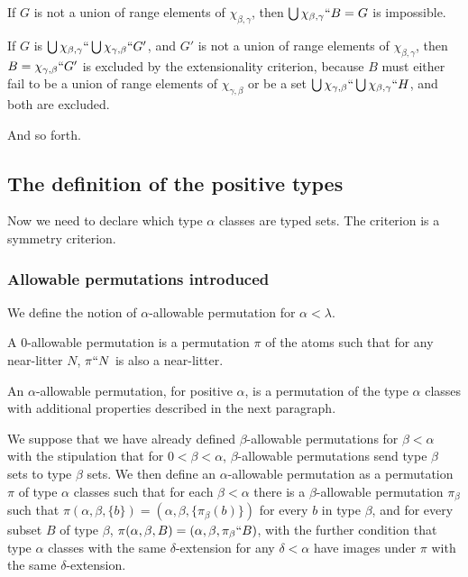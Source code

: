 \documentclass[12pt]{article}
\begin{document}
If $G$ is not a union of range elements of $\chi_{\beta,\gamma}$, then $\bigcup \chi_{\beta,\gamma}``B=G$ is impossible.

If $G$ is $\bigcup \chi_{\beta,\gamma}``\bigcup \chi_{\gamma,\beta}``G'$, and $G'$ is not a union of range elements of $\chi_{\beta,\gamma}$,
then $B=\chi_{\gamma,\beta}``G'$ is excluded by the extensionality criterion, because $B$ must either fail to be a union of range elements of $\chi_{\gamma,\beta}$ or
be a set $\bigcup \chi_{\gamma,\beta}``\bigcup \chi_{\beta,\gamma}``H$, and both are excluded.

And so forth.

\subsection{The definition of the positive types}

Now we need to declare which type $\alpha$ classes are typed sets.  The criterion is a symmetry criterion.

\subsubsection{Allowable permutations introduced}



We define the notion of $\alpha$-allowable permutation for $\alpha<\lambda$.

A 0-allowable permutation is a permutation $\pi$ of the atoms such that for any near-litter $N$, $\pi``N$  is also a near-litter.

An $\alpha$-allowable permutation, for positive $\alpha$, is a permutation of the type $\alpha$ classes with additional properties described in the next paragraph.  

We suppose that we have already defined $\beta$-allowable permutations for $\beta<\alpha$ with the stipulation that for $0<\beta<\alpha$, $\beta$-allowable permutations send type $\beta$ sets to type $\beta$ sets.   We then define an $\alpha$-allowable permutation as a permutation $\pi$ of type $\alpha$ classes such
that for each $\beta<\alpha$ there is a $\beta$-allowable permutation $\pi_\beta$ such that $\pi(\alpha,\beta,\{b\}) = (\alpha,\beta,\{\pi_\beta(b)\})$ for every $b$ in type $\beta$, and for every subset $B$ of type $\beta$, $\pi(\alpha,\beta,B)=(\alpha,\beta,\pi_{\beta}``B)$, with the further
condition that type $\alpha$ classes with the same $\delta$-extension for any $\delta<\alpha$ have images under $\pi$ with the same $\delta$-extension. 
\end{document}
